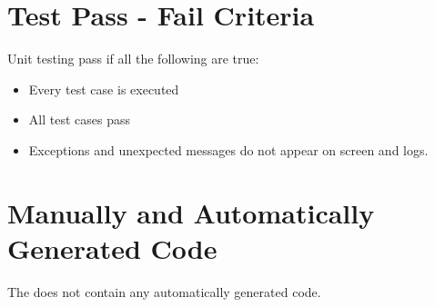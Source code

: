 \section{Test Pass - Fail Criteria}

Unit testing pass if all the following are true:
\begin{itemize}
	\item Every test case is executed
	\item All test cases pass
	\item Exceptions and unexpected messages do not appear on screen and logs.
\end{itemize}



\section{Manually and Automatically Generated Code}

The \FAQAS does not contain any automatically generated code.
